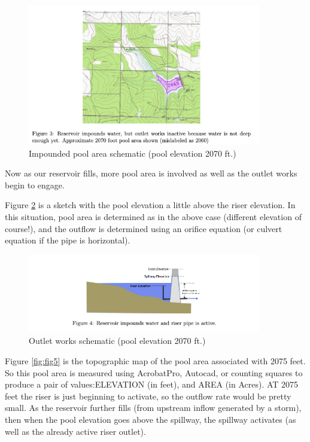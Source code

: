 \documentclass[12pt]{article}
\begin{document}
\begin{figure}[h!] %
   \centering
   \includegraphics[width=4.0in]{fig3.png} 
   \caption{Impounded pool area schematic (pool elevation 2070 ft.)}
   \label{fig:fig3}
\end{figure}

Now as our reservoir fills, more pool area is involved as well as the outlet works begin to engage.

Figure \ref{fig:fig4} is a sketch with the pool elevation a little above the riser elevation. In this situation, pool area is determined as in the above case (different elevation of course!), and the outflow is determined using an orifice equation (or culvert equation if the pipe is horizontal).

\begin{figure}[h!] %
   \centering
   \includegraphics[width=4.0in]{fig4.png} 
   \caption{Outlet works schematic (pool elevation 2070 ft.)}
   \label{fig:fig4}
\end{figure}

Figure \ref{fig:fig5} is the topographic map of the pool area associated with 2075 feet. So this pool area is measured using AcrobatPro, Autocad, or counting squares to produce a pair of values:ELEVATION (in feet), and AREA (in Acres). AT 2075 feet the riser is just beginning to activate, so the outflow rate would be pretty small. As the reservoir further fills (from upstream inflow generated by a storm), then when the pool elevation goes above the spillway, the spillway activates (as well as the already active riser outlet).
\end{document}
